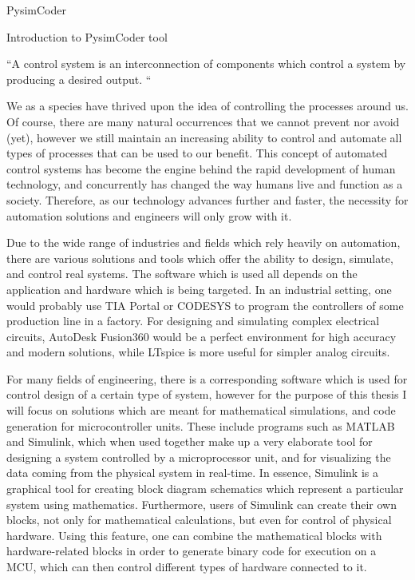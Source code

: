 \chap PysimCoder




\sec Introduction to PysimCoder tool

“A control system is an interconnection of components which control a system by producing a desired output. “

\quad We as a species have thrived upon the idea of controlling the processes around us. Of course, there are many natural
occurrences that we cannot prevent nor avoid (yet), however we still maintain an increasing ability to control and automate all
types of processes that can be used to our benefit. This concept of automated control systems has become the engine behind the
rapid development of human technology, and concurrently has changed the way humans live and function as a society. Therefore,
as our technology advances further and faster, the necessity for automation solutions and engineers will only grow with it. 

\quad Due to the wide range of industries and fields which rely heavily on automation, there are various solutions and tools 
which offer the ability to design, simulate, and control real systems.  The software which is used all depends on the application
and hardware which is being targeted. In an industrial setting, one would probably use TIA Portal or CODESYS to program the
controllers of some production line in a factory. For designing and simulating complex electrical circuits, AutoDesk Fusion360 
would be a perfect environment for high accuracy and modern solutions, while LTspice is more useful for simpler analog circuits. 

\quad For many fields of engineering, there is a corresponding software which is used for control design of a certain type of system,
however for the purpose of this thesis I will focus on solutions which are meant for mathematical simulations, and code generation
for microcontroller units. These include programs such as MATLAB and Simulink, which when used together make up a very elaborate tool
for designing a system controlled by a microprocessor unit, and for visualizing the data coming from the physical system in 
real-time. In essence, Simulink is a graphical tool for creating block diagram schematics which represent a particular system using
mathematics. Furthermore, users of Simulink can create their own blocks, not only for mathematical calculations, but even for control
of physical hardware. Using this feature, one can combine the mathematical blocks with hardware-related blocks in order to generate
binary code for execution on a MCU, which can then control different types of hardware connected to it. 


